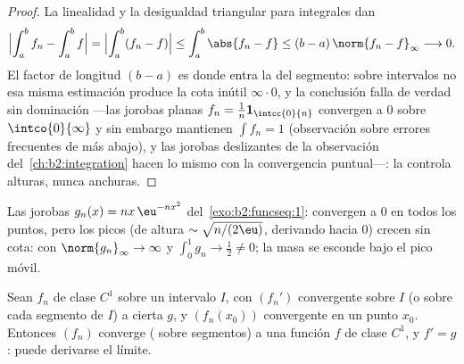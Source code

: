 \begin{proof}
La linealidad y la desigualdad triangular para integrales dan
\[
\Bigl|\int_a^b f_n - \int_a^b f\Bigr|
= \Bigl|\int_a^b (f_n - f)\Bigr|
\leq \int_a^b\abs{f_n - f}
\leq (b - a)\,\norm{f_n - f}_\infty \longrightarrow 0 .
\]
El factor de longitud $(b - a)$ es donde entra la  del
segmento: sobre intervalos no  esa misma estimación
produce la cota inútil $\infty\cdot0$, y la conclusión falla de
verdad sin dominación ---las jorobas planas $f_n =
\frac1n\mathbf 1_{\intcc{0}{n}}$ convergen  a $0$ sobre
$\intco{0}{\infty}$ y sin embargo mantienen $\int f_n = 1$
(observación sobre errores frecuentes de más abajo), y las jorobas
deslizantes de la observación del~\cref{ch:b2:integration} hacen lo
mismo con la convergencia puntual---: la 
controla alturas, nunca anchuras.
\end{proof}

\begin{omfigure}

{\small Las jorobas $g_n(x) = nx\,\eu^{-nx^2}$ del~\cref{exo:b2:funcseq:1}: convergen a $0$ en todos los puntos, pero
los picos (de altura $\sim\sqrt{n/(2\eu)}$, derivando hacia $0$)
crecen sin cota:  con $\norm{g_n}_\infty \to
\infty$ y $\int_0^1 g_n \to \frac12 \neq 0$; la masa se esconde bajo
el pico móvil.}
\end{omfigure}

\begin{theorem}[Derivación]\label{thm:b2:funcseq:differentiation}
Sean $f_n$ de clase $C^1$ sobre un intervalo $I$, con $(f_n')$
convergente \emph{} sobre $I$ (o sobre cada segmento de
$I$) a cierta $g$, y $(f_n(x_0))$ convergente en un punto $x_0$.
Entonces $(f_n)$ converge ( sobre segmentos) a una
función $f$ de clase $C^1$, y $f' = g$: puede derivarse el límite.
\end{theorem}

